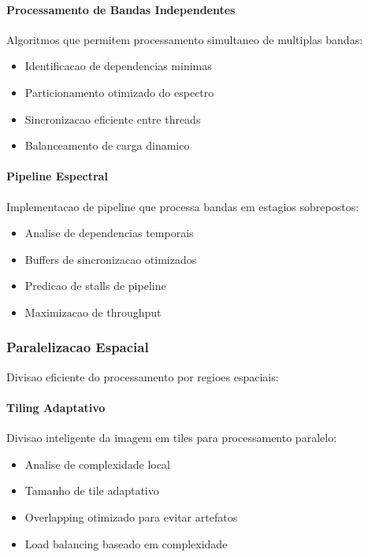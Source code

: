 \paragraph{Processamento de Bandas Independentes}
Algoritmos que permitem processamento simultaneo de multiplas bandas:
\begin{itemize}
    \item Identificacao de dependencias minimas
    \item Particionamento otimizado do espectro
    \item Sincronizacao eficiente entre threads
    \item Balanceamento de carga dinamico
\end{itemize}

\paragraph{Pipeline Espectral}
Implementacao de pipeline que processa bandas em estagios sobrepostos:
\begin{itemize}
    \item Analise de dependencias temporais
    \item Buffers de sincronizacao otimizados
    \item Predicao de stalls de pipeline
    \item Maximizacao de throughput
\end{itemize}

\subsubsection{Paralelizacao Espacial}
Divisao eficiente do processamento por regioes espaciais:

\paragraph{Tiling Adaptativo}
Divisao inteligente da imagem em tiles para processamento paralelo:
\begin{itemize}
    \item Analise de complexidade local
    \item Tamanho de tile adaptativo
    \item Overlapping otimizado para evitar artefatos
    \item Load balancing baseado em complexidade
\end{itemize}

